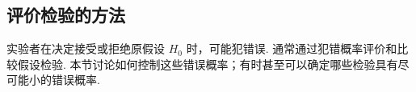 \subsection{评价检验的方法}\label{sec:8.3}
实验者在决定接受或拒绝原假设 $H_0$ 时，可能犯错误. 通常通过犯错概率评价和比较假设检验. 本节讨论如何控制这些错误概率；有时甚至可以确定哪些检验具有尽可能小的错误概率.





